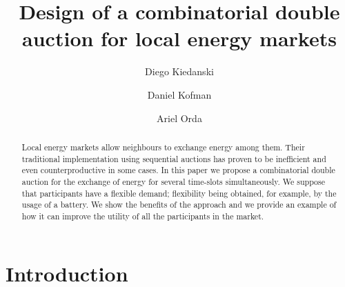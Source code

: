 \documentclass[runningheads]{llncs}
\begin{document}
%
\title{Design of a combinatorial double auction for local energy markets}
%
%
\author{Diego Kiedanski  \and
Daniel Kofman \and
Ariel Orda 
}
%
%
%
\maketitle              %
%
\begin{abstract}

Local energy markets allow neighbours to exchange energy among them. Their traditional implementation using sequential auctions has proven to be inefficient and even counterproductive in some cases. In this paper we propose a combinatorial double auction for the exchange of energy for several time-slots simultaneously.
We suppose that participants have a flexible demand; flexibility being obtained, for example, by the usage of a battery. We show the benefits of the approach and we provide an example of how it can improve the utility of all the participants in the market. 

\end{abstract}
%
%
%

\section{Introduction}
\end{document}
